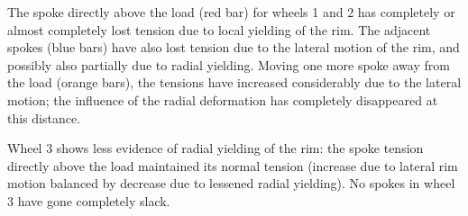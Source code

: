 \documentclass[\rootdir/thesis.tex]{subfiles}
\begin{document}
The spoke directly above the load (red bar) for wheels 1 and 2 has completely or almost completely lost tension due to local yielding of the rim. The adjacent spokes (blue bars) have also lost tension due to the lateral motion of the rim, and possibly also partially due to radial yielding. Moving one more spoke away from the load (orange bars), the tensions have increased considerably due to the lateral motion; the influence of the radial deformation has completely disappeared at this distance.

Wheel 3 shows less evidence of radial yielding of the rim: the spoke tension directly above the load maintained its normal tension (increase due to lateral rim motion balanced by decrease due to lessened radial yielding). No spokes in wheel 3 have gone completely slack.
\end{document}
